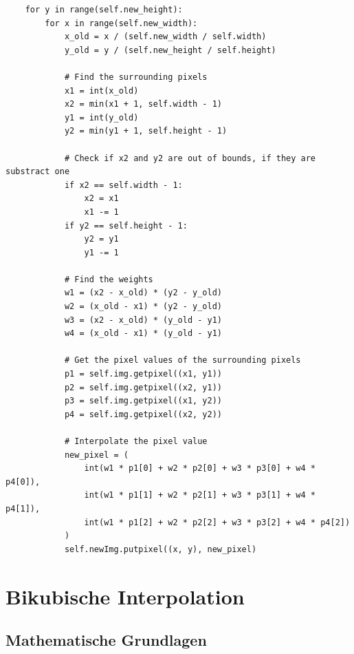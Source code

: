     
    \begin{lstlisting}
    for y in range(self.new_height):
        for x in range(self.new_width):
            x_old = x / (self.new_width / self.width)
            y_old = y / (self.new_height / self.height)
    
            # Find the surrounding pixels
            x1 = int(x_old)
            x2 = min(x1 + 1, self.width - 1)
            y1 = int(y_old)
            y2 = min(y1 + 1, self.height - 1)
    
            # Check if x2 and y2 are out of bounds, if they are substract one
            if x2 == self.width - 1:
                x2 = x1
                x1 -= 1
            if y2 == self.height - 1:
                y2 = y1
                y1 -= 1
    
            # Find the weights
            w1 = (x2 - x_old) * (y2 - y_old)
            w2 = (x_old - x1) * (y2 - y_old)
            w3 = (x2 - x_old) * (y_old - y1)
            w4 = (x_old - x1) * (y_old - y1)
    
            # Get the pixel values of the surrounding pixels
            p1 = self.img.getpixel((x1, y1))
            p2 = self.img.getpixel((x2, y1))
            p3 = self.img.getpixel((x1, y2))
            p4 = self.img.getpixel((x2, y2))
    
            # Interpolate the pixel value
            new_pixel = (
                int(w1 * p1[0] + w2 * p2[0] + w3 * p3[0] + w4 * p4[0]),
                int(w1 * p1[1] + w2 * p2[1] + w3 * p3[1] + w4 * p4[1]),
                int(w1 * p1[2] + w2 * p2[2] + w3 * p3[2] + w4 * p4[2])
            )
            self.newImg.putpixel((x, y), new_pixel)
    \end{lstlisting}
    
\section{Bikubische Interpolation}

\subsection{Mathematische Grundlagen}


    
